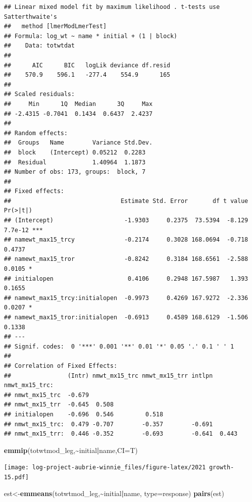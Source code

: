 \documentclass[
]{article}
\newenvironment{Shaded}{\begin{snugshade}}{\end{snugshade}}
\newcommand{\AttributeTok}[1]{\textcolor[rgb]{0.13,0.29,0.53}{#1}}
\newcommand{\FunctionTok}[1]{\textcolor[rgb]{0.13,0.29,0.53}{\textbf{#1}}}
\newcommand{\NormalTok}[1]{#1}
\newcommand{\OtherTok}[1]{\textcolor[rgb]{0.56,0.35,0.01}{#1}}
\newcommand{\SpecialCharTok}[1]{\textcolor[rgb]{0.81,0.36,0.00}{\textbf{#1}}}
\newcommand{\StringTok}[1]{\textcolor[rgb]{0.31,0.60,0.02}{#1}}
\begin{document}
\begin{verbatim}
## Linear mixed model fit by maximum likelihood . t-tests use Satterthwaite's
##   method [lmerModLmerTest]
## Formula: log_wt ~ name * initial + (1 | block)
##    Data: totwtdat
## 
##      AIC      BIC   logLik deviance df.resid 
##    570.9    596.1   -277.4    554.9      165 
## 
## Scaled residuals: 
##     Min      1Q  Median      3Q     Max 
## -2.4315 -0.7041  0.1434  0.6437  2.4237 
## 
## Random effects:
##  Groups   Name        Variance Std.Dev.
##  block    (Intercept) 0.05212  0.2283  
##  Residual             1.40964  1.1873  
## Number of obs: 173, groups:  block, 7
## 
## Fixed effects:
##                               Estimate Std. Error       df t value Pr(>|t|)    
## (Intercept)                    -1.9303     0.2375  73.5394  -8.129  7.7e-12 ***
## namewt_max15_trcy              -0.2174     0.3028 168.0694  -0.718   0.4737    
## namewt_max15_tror              -0.8242     0.3184 168.6561  -2.588   0.0105 *  
## initialopen                     0.4106     0.2948 167.5987   1.393   0.1655    
## namewt_max15_trcy:initialopen  -0.9973     0.4269 167.9272  -2.336   0.0207 *  
## namewt_max15_tror:initialopen  -0.6913     0.4589 168.6129  -1.506   0.1338    
## ---
## Signif. codes:  0 '***' 0.001 '**' 0.01 '*' 0.05 '.' 0.1 ' ' 1
## 
## Correlation of Fixed Effects:
##                (Intr) nmwt_mx15_trc nmwt_mx15_trr intlpn nmwt_mx15_trc:
## nmwt_mx15_trc  -0.679                                                  
## nmwt_mx15_trr  -0.645  0.508                                           
## initialopen    -0.696  0.546         0.518                             
## nmwt_mx15_trc:  0.479 -0.707        -0.357        -0.691               
## nmwt_mx15_trr:  0.446 -0.352        -0.693        -0.641  0.443
\end{verbatim}

\begin{Shaded}
\begin{Highlighting}[]
\FunctionTok{emmip}\NormalTok{(totwtmod\_leg,}\SpecialCharTok{\textasciitilde{}}\NormalTok{initial}\SpecialCharTok{|}\NormalTok{name,}\AttributeTok{CI=}\NormalTok{T)}
\end{Highlighting}
\end{Shaded}

\texttt{[image: log-project-aubrie-winnie\_files/figure-latex/2021 growth-15.pdf]}

\begin{Shaded}
\begin{Highlighting}[]
\NormalTok{est}\OtherTok{\textless{}{-}}\FunctionTok{emmeans}\NormalTok{(totwtmod\_leg,}\SpecialCharTok{\textasciitilde{}}\NormalTok{initial}\SpecialCharTok{|}\NormalTok{name, }\AttributeTok{type=}\StringTok{\textquotesingle{}response\textquotesingle{}}\NormalTok{)}
\FunctionTok{pairs}\NormalTok{(est)}
\end{Highlighting}
\end{Shaded}
\end{document}
